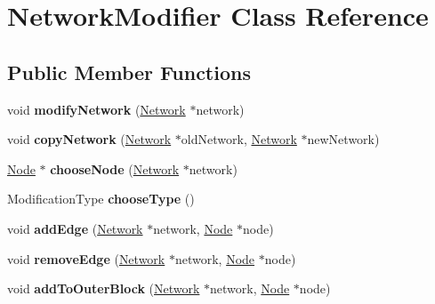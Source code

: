 \hypertarget{classNetworkModifier}{}\section{Network\+Modifier Class Reference}
\label{classNetworkModifier}
\subsection*{Public Member Functions}
\begin{DoxyCompactItemize}
\item 
void {\bfseries modify\+Network} (\hyperlink{classNetwork}{Network} $\ast$network)\hypertarget{classNetworkModifier_a7d5af0b6aaa1a8365ff03749a7eb0376}{}\label{classNetworkModifier_a7d5af0b6aaa1a8365ff03749a7eb0376}

\item 
void {\bfseries copy\+Network} (\hyperlink{classNetwork}{Network} $\ast$old\+Network, \hyperlink{classNetwork}{Network} $\ast$new\+Network)\hypertarget{classNetworkModifier_a2ab956789ff4a954e0e3dd027512012b}{}\label{classNetworkModifier_a2ab956789ff4a954e0e3dd027512012b}

\item 
\hyperlink{classNode}{Node} $\ast$ {\bfseries choose\+Node} (\hyperlink{classNetwork}{Network} $\ast$network)\hypertarget{classNetworkModifier_a236ee2c417412e6333d4ed855bd9f88f}{}\label{classNetworkModifier_a236ee2c417412e6333d4ed855bd9f88f}

\item 
Modification\+Type {\bfseries choose\+Type} ()\hypertarget{classNetworkModifier_a11a4d6c3bb19cda4e9714ad296d72db1}{}\label{classNetworkModifier_a11a4d6c3bb19cda4e9714ad296d72db1}

\item 
void {\bfseries add\+Edge} (\hyperlink{classNetwork}{Network} $\ast$network, \hyperlink{classNode}{Node} $\ast$node)\hypertarget{classNetworkModifier_a7486df4a68343d65eb5bfb766d6959dd}{}\label{classNetworkModifier_a7486df4a68343d65eb5bfb766d6959dd}

\item 
void {\bfseries remove\+Edge} (\hyperlink{classNetwork}{Network} $\ast$network, \hyperlink{classNode}{Node} $\ast$node)\hypertarget{classNetworkModifier_a98de1cc69f96a312d823a18fb4e32125}{}\label{classNetworkModifier_a98de1cc69f96a312d823a18fb4e32125}

\item 
void {\bfseries add\+To\+Outer\+Block} (\hyperlink{classNetwork}{Network} $\ast$network, \hyperlink{classNode}{Node} $\ast$node)\hypertarget{classNetworkModifier_aa3003a2ca2ba2a64e3dfa52372befafe}{}\label{classNetworkModifier_aa3003a2ca2ba2a64e3dfa52372befafe}


\end{DoxyCompactItemize}
